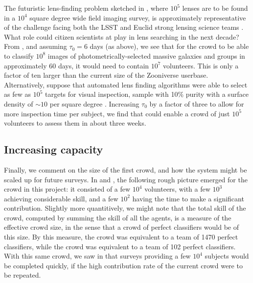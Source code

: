 \documentclass[useAMS,usenatbib,a4paper]{mn2e}
\begin{document}
The futuristic lens-finding problem sketched in , where $10^5$
lenses are to be found in a $10^4$ square degree wide field imaging survey, is
approximately representative of the challenge facing both the LSST and Euclid
strong lensing science teams \citep{LSSTSciBook,EuclidSciBook}. What role could
citizen scientists at \SW play in lens searching in the next decade? From
, and assuming $\tau_0 = 6$ days (as above), we see that for the
\SW crowd to be able to classify $10^8$ images of  photometrically-selected
massive galaxies and groups in approximately 60 days, it would need to contain
$10^7$ volunteers. This is only  a factor of ten larger than the current size of
the Zooniverse userbase. Alternatively, suppose that automated  lens finding
algorithms were able to select as few as $10^5$ targets for visual
inspection,
sample with 10\% purity with a surface density of $\sim10$ per square degree
\citep[a rate within reach of \RF, for example:][]{GavazziEtal2014}.
Increasing $\tau_0$ by a factor of three to allow for
more inspection time per subject,  we find that \SW could enable a crowd of just
$10^5$ volunteers to assess them in about three weeks.


\subsection{Increasing capacity}
\label{sec:discuss:capacity}

Finally, we comment on the size of the first \SW crowd, and how the system might
be scaled up for future surveys. In  and
, the following rough picture emerged for the \SW
crowd in this project: it consisted of a few $10^4$ volunteers, with a few
$10^3$ achieving considerable skill, and a few $10^2$ having the time to make a
significant contribution. Slightly more quantitively, we might note that  the
total skill of the crowd, computed by summing the skill of all the agents, is a
measure of the effective crowd size, in the sense that a crowd of perfect
classifiers would be of this size. By this measure, the \StageOne crowd was
equivalent to a team of 1470 perfect classifiers, while the \StageTwo crowd was
equivalent to a team of 102 perfect classifiers. With this same crowd, we saw in
  that surveys providing a few $10^4$ subjects would be
completed quickly, if the high contribution rate of the current crowd were to be
repeated.
\end{document}
